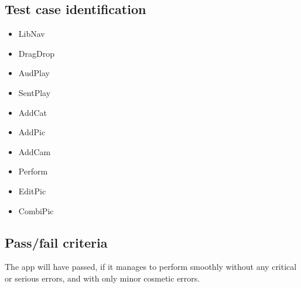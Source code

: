 \subsection*{Test case identification}
\begin{itemize}
	\item LibNav
	\item DragDrop
	\item AudPlay
	\item SentPlay
	\item AddCat
	\item AddPic
	\item AddCam
	\item Perform
	\item EditPic
	\item CombiPic
\end{itemize}

\subsection*{Pass/fail criteria}
The app will have passed, if it manages to perform smoothly without any critical or serious errors, and with only minor cosmetic errors.

